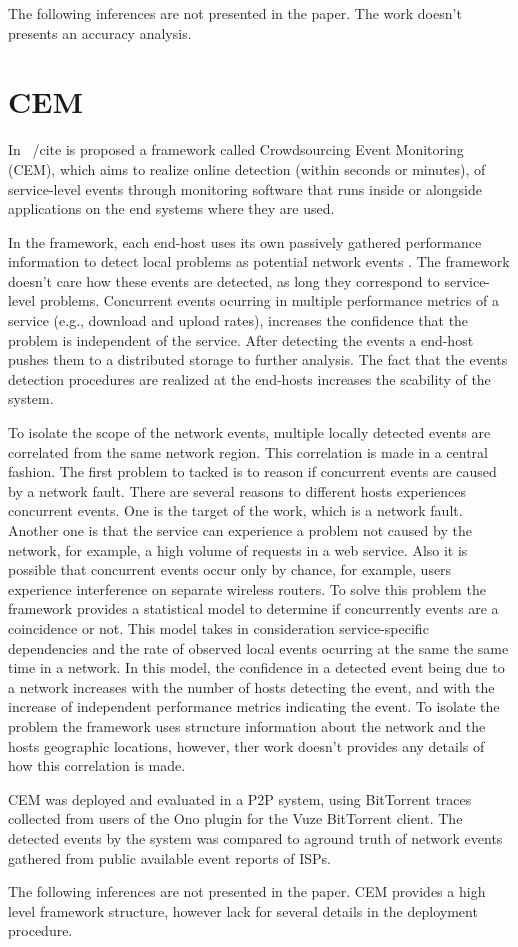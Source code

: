 The following inferences are not presented in the paper. The work doesn't
presents an accuracy analysis.

\section{CEM}

In ~/cite{} is proposed a
framework called Crowdsourcing Event Monitoring (CEM), which aims to realize
online detection (within seconds or minutes), of service-level events through
monitoring software that runs inside or alongside applications on the end
systems where they are used.

In the framework, each end-host uses its own passively gathered
performance information to detect local problems as potential network events
. The framework doesn't care how these events are detected,
as long they
correspond to service-level problems. Concurrent events ocurring in multiple
performance metrics of a service (e.g., download and upload rates), increases the
confidence that the problem is independent of the service. After detecting the
events a end-host pushes them to a distributed storage to further analysis. The
fact that the events detection procedures are realized at the end-hosts
increases the scability of the system.

To isolate
the scope of the network events, multiple locally detected events are
correlated from the same network region. This correlation is made in a central
fashion.
The first problem to tacked is to reason if concurrent events are caused by a
network fault. There are several reasons to different hosts experiences
concurrent events. One is the target of the work, which is a network fault.
Another one is that the service can experience a problem not caused by the
network, for example, a high volume of requests in a web service. Also it is
possible that concurrent events occur only by chance, for example, users
experience interference on separate wireless routers. To solve this problem the
framework provides a statistical model to determine if
concurrently events are a coincidence or not. This model takes in
consideration service-specific dependencies and the rate of observed local
events ocurring at the same the same time in a network. In this model, the
confidence in a detected event being due to a network increases with the
number of hosts detecting the event, and with the increase of independent
performance metrics indicating the event. To isolate the problem the framework
uses structure information about the network and the hosts geographic
locations, however, ther work doesn't provides any details of how this
correlation is made.

CEM was deployed and evaluated in a P2P system, using BitTorrent traces collected
from users of the Ono plugin for the Vuze BitTorrent client. The detected
events by the system was compared to aground truth
of network events gathered from public available event reports of ISPs.

The following inferences are not presented in the paper.
CEM provides a high level framework structure, however lack for several details
in the deployment procedure.
